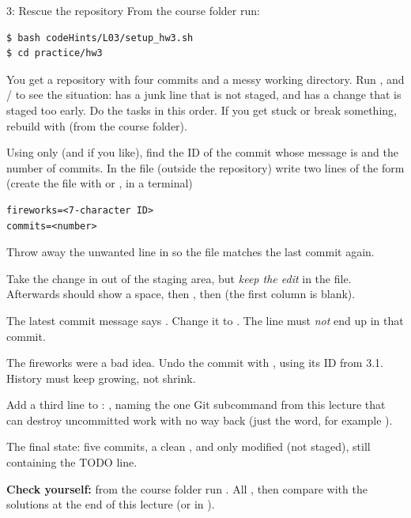 \begin{homework}{3: Rescue the repository}
From the course folder run:
\begin{lstlisting}
$ bash codeHints/L03/setup_hw3.sh
$ cd practice/hw3
\end{lstlisting}
You get a repository with four commits and a messy working directory. Run ,  and / to see the situation:  has a junk line that is not staged, and  has a change that is staged too early. Do the tasks in this order. If you get stuck or break something, rebuild with  (from the course folder).

\begin{description}[leftmargin=1.2em,style=nextline]
\item[3.1 Investigate] Using only  (and  if you like), find the ID of the commit whose message is  and the number of commits. In the file  (outside the repository) write two lines of the form (create the file with  or , in a terminal)
\begin{lstlisting}
fireworks=<7-character ID>
commits=<number>
\end{lstlisting}
\item[3.2 Discard the junk] Throw away the unwanted line in  so the file matches the last commit again.
\item[3.3 Unstage] Take the change in  out of the staging area, but \emph{keep the edit} in the file. Afterwards  should show a space, then , then  (the first column is blank).
\item[3.4 Fix the typo] The latest commit message says . Change it to . The  line must \emph{not} end up in that commit.
\item[3.5 Revert] The fireworks were a bad idea. Undo the commit  with , using its ID from 3.1. History must keep growing, not shrink.
\item[3.6 Question] Add a third line to : , naming the one Git subcommand from this lecture that can destroy uncommitted work with no way back (just the word, for example ).
\end{description}

The final state: five commits, a clean , and only  modified (not staged), still containing the TODO line.

\textbf{Check yourself:} from the course folder run . All , then compare with the solutions at the end of this lecture (or in ).
\end{homework}

